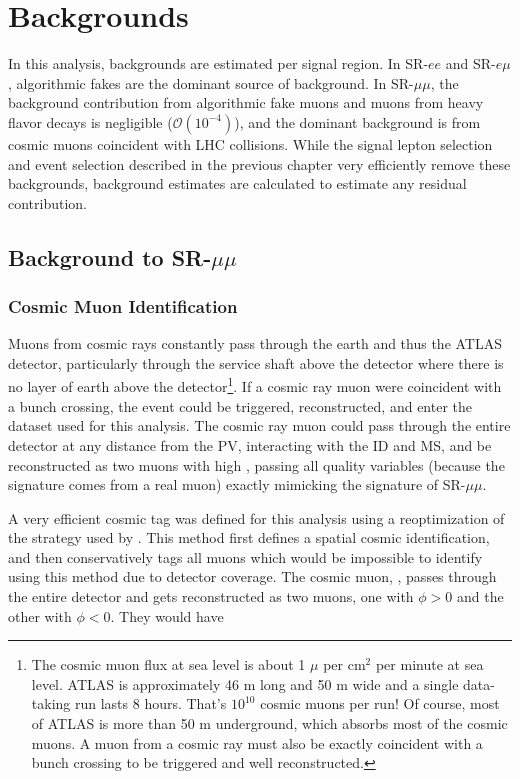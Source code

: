 \chapter{Backgrounds}

In this analysis, backgrounds are estimated per signal region. In SR-$ee$ and SR-$e\mu$, algorithmic fakes are the dominant source of background. In SR-$\mu\mu$, the background contribution from algorithmic fake muons and muons from heavy flavor decays is negligible ($\mathcal{O}(10^{-4})$), and the dominant background is from cosmic muons coincident with \ac{LHC} collisions. While the signal lepton selection and event selection described in the previous chapter very efficiently remove these backgrounds, background estimates are calculated to estimate any residual contribution. 

\section{Background to SR-$\mu\mu$}

\subsection{Cosmic Muon Identification}
\label{sec:cosmics}
Muons from cosmic rays constantly pass through the earth and thus the \ac{ATLAS} detector, particularly through the service shaft above the detector where there is no layer of earth above the detector\footnote{The cosmic muon flux at sea level is about 1 $\mu$ per cm$^2$ per minute at sea level. ATLAS is approximately 46 m long and 50 m wide and a single data-taking run lasts 8 hours. That's $10^{10}$ cosmic muons per run! Of course, most of \ac{ATLAS} is more than 50 m underground, which absorbs most of the cosmic muons. A muon from a cosmic ray must also be exactly coincident with a bunch crossing to be triggered and well reconstructed. }. If a cosmic ray muon were coincident with a bunch crossing, the event could be triggered, reconstructed, and enter the dataset used for this analysis. The cosmic ray muon could pass through the entire detector at any distance from the \ac{PV}, interacting with the \ac{ID} and \ac{MS}, and be reconstructed as two muons with high \absdz, passing all quality variables (because the signature comes from a real muon) exactly mimicking the signature of SR-$\mu\mu$. 

A very efficient cosmic tag was defined for this analysis using a reoptimization of the strategy used by \cite{ATLAS-CONF-2019-006}.  This method first defines a spatial cosmic identification, and then conservatively tags all muons which would be impossible to identify using this method due to detector coverage. The cosmic muon, \mcos, passes through the entire detector and gets reconstructed as two muons, one with $\phi > 0$ and the other with $\phi < 0$. They would have 

